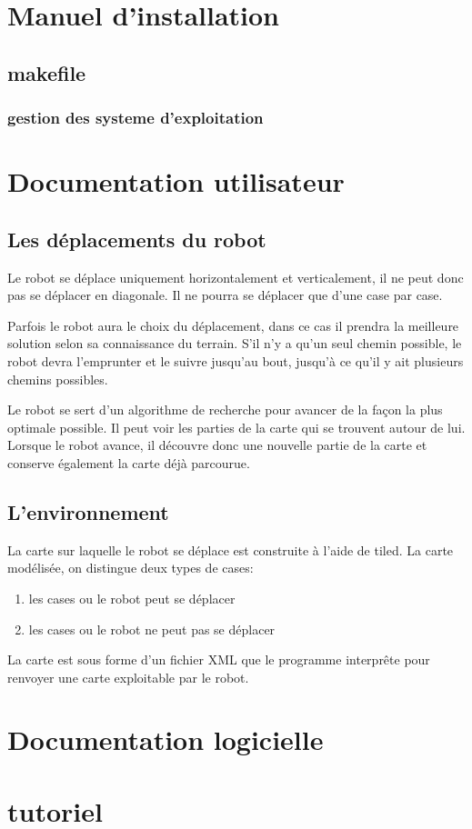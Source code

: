 \documentclass[a4paper 12pts]{article}
\begin{document}
\section{Manuel d'installation}

\subsection{makefile}

\subsubsection{gestion des systeme d'exploitation}
\subsection{}



\section{Documentation utilisateur}

\subsection{Les déplacements du robot}
Le robot se déplace uniquement horizontalement et verticalement, il ne peut donc pas se déplacer en diagonale. Il ne pourra se déplacer que d'une case par case.

Parfois le robot aura le choix du déplacement, dans ce cas il prendra la meilleure solution selon sa connaissance du terrain. S'il n'y a qu'un seul chemin possible, le robot devra l'emprunter et le suivre jusqu'au bout, jusqu'à ce qu'il y ait plusieurs chemins possibles.

Le robot se sert d'un algorithme de recherche pour avancer de la façon la plus optimale possible. Il peut voir les parties de la carte qui se trouvent autour de lui. 
Lorsque le robot avance, il découvre donc une nouvelle partie de la carte et conserve également la carte déjà parcourue.

\subsection{L'environnement}
La carte sur laquelle le robot se déplace est construite à l'aide de tiled. La carte modélisée, on distingue deux types de cases:

\begin{enumerate}
	\item les cases ou le robot peut se déplacer
	\item les cases ou le robot ne peut pas se déplacer
\end{enumerate}

La carte est sous forme d'un fichier XML que le programme interprête pour renvoyer une carte exploitable par le robot.



\section{Documentation logicielle}

\section{tutoriel}
\end{document}
